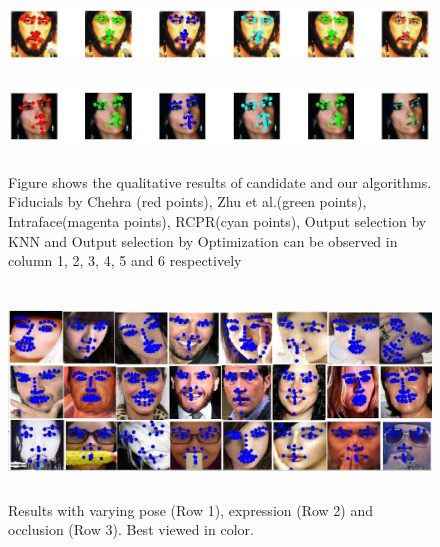 \begin{figure}
  \includegraphics[width=6in, height=0.8in]{fid/figures/qualitative/9.jpg}
  \includegraphics[width=6in, height=0.8in]{fid/figures/qualitative/10.jpg}
  \caption{Figure shows the qualitative results of candidate and our algorithms. Fiducials by Chehra\cite{asthanaCVPR14_Chehra} (red points), Zhu et al.\cite{xhucvpr12_wild}(green points), Intraface\cite{xiongCVPR13_SDM}(magenta points), RCPR\cite{artizzzuICCV13_COFW}(cyan points), Output selection by KNN and Output selection by Optimization can be observed in column 1, 2, 3, 4, 5 and 6 respectively}
  \label{fig:qualitative_result}
\end{figure}

\begin{figure}
  \centering
  \includegraphics[width=6in,height=2.2in]{fid/figures/pose_expression_occlusion.png}
  \caption{Results with varying pose (Row 1), expression (Row 2) and 
  occlusion (Row 3). Best viewed in color.}
  \label{fig:sample_results}
\end{figure}

\label{subsec:quant}

